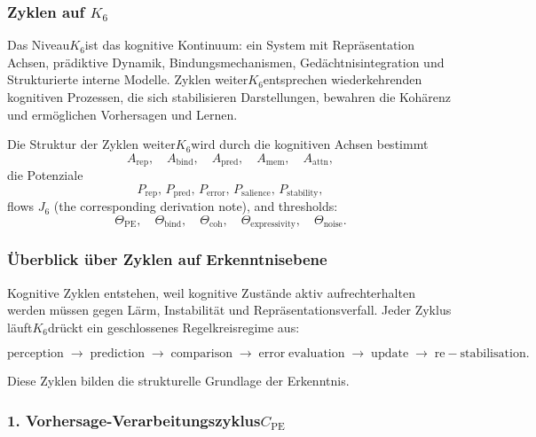 
\subsubsection{Zyklen auf \texorpdfstring{$K_6$}{K_6}}
\label{sec:cycles-k6}

Das Niveau$K_6$ist das kognitive Kontinuum: ein System mit Repräsentation
Achsen, prädiktive Dynamik, Bindungsmechanismen, Gedächtnisintegration und
Strukturierte interne Modelle.
Zyklen weiter$K_6$entsprechen wiederkehrenden kognitiven Prozessen, die sich stabilisieren
Darstellungen, bewahren die Kohärenz und ermöglichen Vorhersagen und Lernen.

Die Struktur der Zyklen weiter$K_6$wird durch die kognitiven Achsen bestimmt
\[
 A_{\mathrm{rep}},\quad
 A_{\mathrm{bind}},\quad
 A_{\mathrm{pred}},\quad
 A_{\mathrm{mem}},\quad
 A_{\mathrm{attn}},
\]
die Potenziale
\[
 P_{\mathrm{rep}},\, P_{\mathrm{pred}},\, P_{\mathrm{error}},\, 
 P_{\mathrm{salience}},\, P_{\mathrm{stability}},
\]
flows $J_6$ (the corresponding derivation note), and thresholds:
\[
 \Theta_{\mathrm{PE}},\quad
 \Theta_{\mathrm{bind}},\quad
 \Theta_{\mathrm{coh}},\quad
 \Theta_{\mathrm{expressivity}},\quad
 \Theta_{\mathrm{noise}}.
\]

\subsubsection{Überblick über Zyklen auf Erkenntnisebene}

Kognitive Zyklen entstehen, weil kognitive Zustände aktiv aufrechterhalten werden müssen
gegen Lärm, Instabilität und Repräsentationsverfall.
Jeder Zyklus läuft$K_6$drückt ein geschlossenes Regelkreisregime aus:

\[
  \mathrm{perception}
  \;\to\;
  \mathrm{prediction}
  \;\to\;
  \mathrm{comparison}
  \;\to\;
  \mathrm{error\;evaluation}
  \;\to\;
  \mathrm{update}
  \;\to\;
  \mathrm{re-stabilisation}.
\]

Diese Zyklen bilden die strukturelle Grundlage der Erkenntnis.

\subsubsection{1. Vorhersage-Verarbeitungszyklus$C_{\mathrm{PE}}$}

